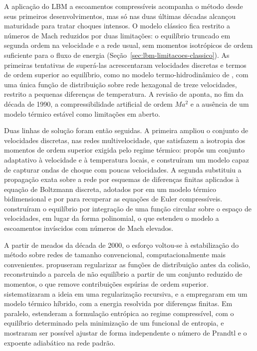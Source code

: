 A aplicação do LBM a escoamentos compressíveis acompanha o método desde seus primeiros desenvolvimentos, mas só nas duas últimas décadas alcançou maturidade para tratar choques intensos.
O modelo clássico fica restrito a números de Mach reduzidos por duas limitações: o equilíbrio truncado em segunda ordem na velocidade e a rede usual, sem momentos isotrópicos de ordem suficiente para o fluxo de energia (Seção~\ref{sec:lbm-limitacoes-classico}).
As primeiras tentativas de superá-las acrescentaram velocidades discretas e termos de ordem superior ao equilíbrio, como no modelo termo-hidrodinâmico de \textcite{Alexander1993}, com uma única função de distribuição sobre rede hexagonal de treze velocidades, restrito a pequenas diferenças de temperatura.
A revisão de \textcite{Chen1998} aponta, no fim da década de 1990, a compressibilidade artificial de ordem $Ma^2$ e a ausência de um modelo térmico estável como limitações em aberto.

Duas linhas de solução foram então seguidas.
A primeira ampliou o conjunto de velocidades discretas, nas redes multivelocidade, que satisfazem a isotropia dos momentos de ordem superior exigida pelo regime térmico: \textcite{Sun1998} propôs um conjunto adaptativo à velocidade e à temperatura locais, e \textcite{Yan1999} construíram um modelo capaz de capturar ondas de choque com poucas velocidades.
A segunda substituiu a propagação exata sobre a rede por esquemas de diferenças finitas aplicados à equação de Boltzmann discreta, adotados por \textcite{Watari2003} em um modelo térmico bidimensional e por \textcite{Kataoka2004} para recuperar as equações de Euler compressíveis.
\textcite{Qu2007} construíram o equilíbrio por integração de uma função circular sobre o espaço de velocidades, em lugar da forma polinomial, o que estendeu o modelo a escoamentos invíscidos com números de Mach elevados.

A partir de meados da década de 2000, o esforço voltou-se à estabilização do método sobre redes de tamanho convencional, computacionalmente mais convenientes.
\textcite{Latt2006} propuseram regularizar as funções de distribuição antes da colisão, reconstruindo a parcela de não equilíbrio a partir de um conjunto reduzido de momentos, o que remove contribuições espúrias de ordem superior.
\textcite{Coreixas2017} sistematizaram a ideia em uma regularização recursiva, e \textcite{Feng2019} a empregaram em um modelo térmico híbrido, com a energia resolvida por diferenças finitas.
Em paralelo, \textcite{Frapolli2015} estenderam a formulação entrópica ao regime compressível, com o equilíbrio determinado pela minimização de um funcional de entropia, e \textcite{Saadat2019} mostraram ser possível ajustar de forma independente o número de Prandtl e o expoente adiabático na rede padrão.

